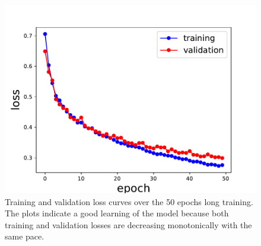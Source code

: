 \begin{figure}[H]
    \centering
    \includegraphics[width=\textwidth]{figures/Phasing/loss_central_patch.pdf}
    \caption{Training and validation loss curves over the 50 epochs long training. The plots indicate a good learning 
    of the model because both training and validation losses are decreasing monotonically with the same pace.}
    
    \label{fig:loss_3D_lowstrain}

\end{figure}


